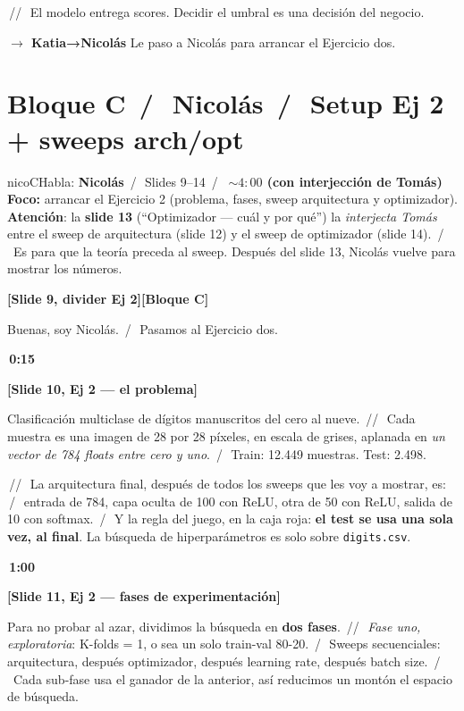 \documentclass[11pt,a4paper]{article}
\newcommand{\code}[1]{\texttt{\textcolor{accent}{#1}}}
\newcommand{\slidenum}[1]{\textcolor{accent}{\textbf{[Slide #1]}}}
\newcommand{\timing}[1]{\textcolor{muted}{\textbf{\,#1\,}}}
\newcommand{\bloque}[1]{\textcolor{muted}{\small\textbf{[Bloque #1]}}}
\newcommand{\enunciado}[1]{\textcolor{warn}{\textit{#1}}}
\newcommand{\pausa}{\textcolor{muted}{\,/\,}}
\newcommand{\Pausa}{\textcolor{muted}{\,/\!/\,}}
\newcommand{\paso}[1]{\textcolor{accent}{\textbf{$\to$ #1}}}
\begin{document}
\Pausa\ El modelo entrega scores. Decidir el umbral es una decisión del negocio.

\paso{Katia→Nicolás} \quad Le paso a Nicolás para arrancar el Ejercicio dos.

\section{Bloque C \pausa\ \textcolor{nicoC}{Nicolás} \pausa\ Setup Ej 2 + sweeps arch/opt}\label{sec:bloqueC}

\begin{personabox}{nicoC}{Habla: \textcolor{nicoC}{\textbf{Nicolás}} \pausa\ Slides 9--14 \pausa\ \timing{$\sim 4:00$ (con interjección de Tomás)}}
\textbf{Foco:} arrancar el Ejercicio 2 (problema, fases, sweep arquitectura y optimizador). \\
\textbf{Atención}: la \textbf{slide 13} (``Optimizador --- cuál y por qué'') la \emph{interjecta Tomás} entre el sweep de arquitectura (slide 12) y el sweep de optimizador (slide 14). \pausa\ Es para que la teoría preceda al sweep. Después del slide 13, Nicolás vuelve para mostrar los números.
\end{personabox}

\slidenum{9, divider Ej 2}\quad \bloque{C}

Buenas, soy Nicolás. \pausa\ Pasamos al Ejercicio dos.

\timing{0:15}

\slidenum{10, Ej 2 — el problema}

Clasificación multiclase de dígitos manuscritos del cero al nueve. \Pausa\ Cada muestra es una imagen de 28 por 28 píxeles, en escala de grises, aplanada en \enunciado{un vector de 784 floats entre cero y uno}. \pausa\ Train: 12.449 muestras. Test: 2.498.

\Pausa\ La arquitectura final, después de todos los sweeps que les voy a mostrar, es: \pausa\ entrada de 784, capa oculta de 100 con ReLU, otra de 50 con ReLU, salida de 10 con softmax. \pausa\ Y la regla del juego, en la caja roja: \textbf{el test se usa una sola vez, al final}. La búsqueda de hiperparámetros es solo sobre \code{digits.csv}.

\timing{1:00}

\slidenum{11, Ej 2 — fases de experimentación}

Para no probar al azar, dividimos la búsqueda en \textbf{dos fases}. \Pausa\ \emph{Fase uno, exploratoria}: K-folds = 1, o sea un solo train-val 80-20. \pausa\ Sweeps secuenciales: arquitectura, después optimizador, después learning rate, después batch size. \pausa\ Cada sub-fase usa el ganador de la anterior, así reducimos un montón el espacio de búsqueda.
\end{document}
